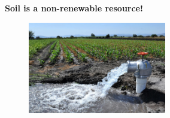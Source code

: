 \begin{frame}
\begin{minipage}{0.6\textwidth}
\begin{itemize}
			      \textbf{Soil is a non-renewable resource!}
		\end{itemize}
	\end{minipage}
	\begin{minipage}{0.37\textwidth}
		\begin{figure}[ht!]
			\centering
			\includegraphics[height=4cm]{wasted_water}
		\end{figure}
	\end{minipage}
\end{frame}

